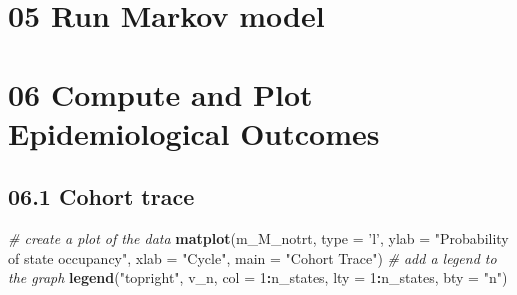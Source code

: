 \documentclass[]{article}
\newenvironment{Shaded}{\begin{snugshade}}{\end{snugshade}}
\newcommand{\KeywordTok}[1]{\textcolor[rgb]{0.13,0.29,0.53}{\textbf{#1}}}
\newcommand{\DataTypeTok}[1]{\textcolor[rgb]{0.13,0.29,0.53}{#1}}
\newcommand{\DecValTok}[1]{\textcolor[rgb]{0.00,0.00,0.81}{#1}}
\newcommand{\StringTok}[1]{\textcolor[rgb]{0.31,0.60,0.02}{#1}}
\newcommand{\CommentTok}[1]{\textcolor[rgb]{0.56,0.35,0.01}{\textit{#1}}}
\newcommand{\ControlFlowTok}[1]{\textcolor[rgb]{0.13,0.29,0.53}{\textbf{#1}}}
\newcommand{\OperatorTok}[1]{\textcolor[rgb]{0.81,0.36,0.00}{\textbf{#1}}}
\newcommand{\NormalTok}[1]{#1}
\begin{document}
\section{05 Run Markov model}\label{run-markov-model}

\begin{Shaded}
\end{Shaded}

\section{06 Compute and Plot Epidemiological
Outcomes}\label{compute-and-plot-epidemiological-outcomes}

\subsection{06.1 Cohort trace}\label{cohort-trace-1}

\begin{Shaded}
\begin{Highlighting}[]
\CommentTok{# create a plot of the data}
\KeywordTok{matplot}\NormalTok{(m_M_notrt, }\DataTypeTok{type =} \StringTok{'l'}\NormalTok{, }
        \DataTypeTok{ylab =} \StringTok{"Probability of state occupancy"}\NormalTok{,}
        \DataTypeTok{xlab =} \StringTok{"Cycle"}\NormalTok{,}
        \DataTypeTok{main =} \StringTok{"Cohort Trace"}\NormalTok{)             }
\CommentTok{# add a legend to the graph}
\KeywordTok{legend}\NormalTok{(}\StringTok{"topright"}\NormalTok{, v_n, }\DataTypeTok{col =} \DecValTok{1}\OperatorTok{:}\NormalTok{n_states, }\DataTypeTok{lty =} \DecValTok{1}\OperatorTok{:}\NormalTok{n_states, }\DataTypeTok{bty =} \StringTok{"n"}\NormalTok{) }
\end{Highlighting}
\end{Shaded}
\end{document}
